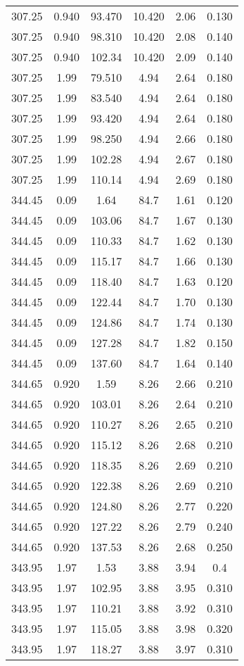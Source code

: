 \begin{longtable}{||c|c|c|c|c|c||}
307.25	&0.940	&93.470	&10.420	&2.06	&0.130\\
307.25	&0.940	&98.310	&10.420	&2.08	&0.140\\
307.25	&0.940	&102.34	&10.420	&2.09	&0.140\\
307.25	&1.99	&79.510	&4.94	&2.64	&0.180\\
307.25	&1.99	&83.540	&4.94	&2.64	&0.180\\
307.25	&1.99	&93.420	&4.94	&2.64	&0.180\\
307.25	&1.99	&98.250	&4.94	&2.66	&0.180\\
307.25	&1.99	&102.28	&4.94	&2.67	&0.180\\
307.25	&1.99	&110.14	&4.94	&2.69	&0.180\\
344.45	&0.09	&1.64	&84.7	&1.61	&0.120\\
344.45	&0.09	&103.06	&84.7	&1.67	&0.130\\
344.45	&0.09	&110.33	&84.7	&1.62	&0.130\\
344.45	&0.09	&115.17	&84.7	&1.66	&0.130\\
344.45	&0.09	&118.40	&84.7	&1.63	&0.120\\
344.45	&0.09	&122.44	&84.7	&1.70	&0.130\\
344.45	&0.09	&124.86	&84.7	&1.74	&0.130\\
344.45	&0.09	&127.28	&84.7	&1.82	&0.150\\
344.45	&0.09	&137.60	&84.7	&1.64	&0.140\\
344.65	&0.920	&1.59	&8.26	&2.66	&0.210\\
344.65	&0.920	&103.01	&8.26	&2.64	&0.210\\
344.65	&0.920	&110.27	&8.26	&2.65	&0.210\\
344.65	&0.920	&115.12	&8.26	&2.68	&0.210\\
344.65	&0.920	&118.35	&8.26	&2.69	&0.210\\
344.65	&0.920	&122.38	&8.26	&2.69	&0.210\\
344.65	&0.920	&124.80	&8.26	&2.77	&0.220\\
344.65	&0.920	&127.22	&8.26	&2.79	&0.240\\
344.65	&0.920	&137.53	&8.26	&2.68	&0.250\\
343.95	&1.97	&1.53	&3.88	&3.94	&0.4\\
343.95	&1.97	&102.95	&3.88	&3.95	&0.310\\
343.95	&1.97	&110.21	&3.88	&3.92	&0.310\\
343.95	&1.97	&115.05	&3.88	&3.98	&0.320\\
343.95	&1.97	&118.27	&3.88	&3.97	&0.310\\

\end{longtable}
